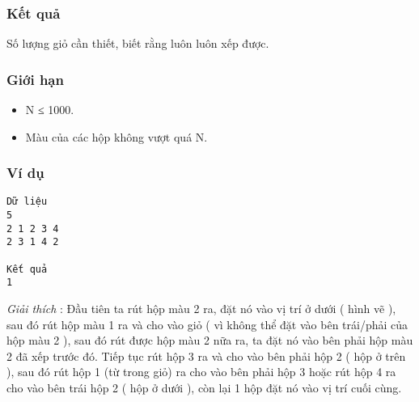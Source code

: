 \subsubsection{   Kết quả  }

   Số lượng giỏ cần thiết, biết rằng luôn luôn xếp được.  

\subsubsection{   Giới hạn  }
\begin{itemize}
	\item     N ≤ 1000.   
	\item     Màu của các hộp không vượt quá N.   
\end{itemize}

\subsubsection{   Ví dụ  }
\begin{verbatim}
Dữ liệu
5
2 1 2 3 4
2 3 1 4 2

Kết quả
1
\end{verbatim}

\textit{    Giải thích   }   : Đầu tiên ta rút hộp màu 2 ra, đặt nó vào vị   trí ở dưới ( hình vẽ ), sau đó rút hộp màu 1 ra và cho vào giỏ ( vì không thể đặt vào bên trái/phải của hộp màu 2 ), sau đó rút được hộp màu 2 nữa ra, ta đặt nó vào bên phải hộp màu 2 đã xếp trước đó. Tiếp tục rút hộp 3 ra và cho vào bên phải hộp 2 ( hộp ở trên ), sau đó rút hộp 1 (từ trong giỏ) ra cho vào bên phải hộp 3 hoặc rút hộp 4 ra cho vào bên trái hộp 2 ( hộp ở dưới ), còn lại 1 hộp đặt nó vào vị trí cuối cùng.  